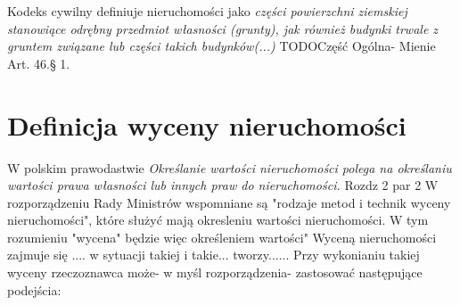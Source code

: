 \documentclass[a4paper,12pt,twoside,openany]{report}
\begin{document}
Kodeks cywilny  definiuje nieruchomości jako
\textit { części powierzchni ziemskiej stanowiące odrębny przedmiot własności (grunty), jak również budynki trwale z gruntem związane lub części takich budynków(...)} \cite{KC} TODOCzęść Ogólna- Mienie  Art. 46.§ 1.


\section{Definicja wyceny nieruchomości}
W polskim prawodastwie 
\textit{ Określanie wartości nieruchomości polega na określaniu wartości prawa własności lub innych praw do nieruchomości.} \cite{RRM} Rozdz 2 par 2
W rozporządzeniu Rady Ministrów wspomniane są "rodzaje metod i technik wyceny nieruchomości", które służyć mają okresleniu wartości nieruchomości. W tym rozumieniu "wycena" będzie więc określeniem wartości" 
Wyceną nieruchomości zajmuje się  .... w sytuacji takiej i takie... tworzy......
Przy wykonianiu takiej wyceny rzeczoznawca może- w myśl rozporządzenia- zastosować następujące podejścia:
\end{document}
